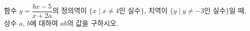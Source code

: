 함수 $y=\dfrac{bx-5}{x+2a}$의 정의역이 $\{x \mid x\ne 4$인 실수$\}$, 치역이 $\{y \mid y\ne -3$인 실수$\}$일 때, 상수 $a$, $b$에 대하여 $ab$의 값을 구하시오.
